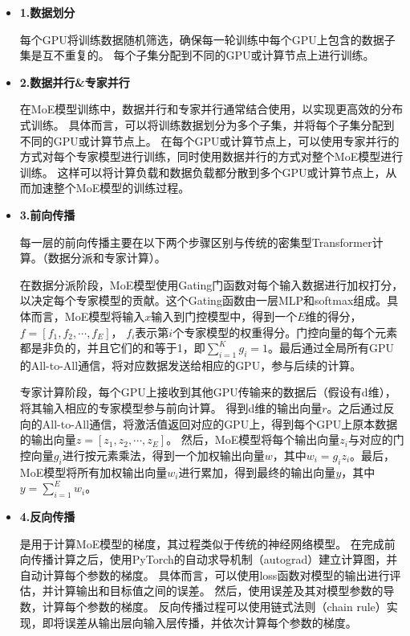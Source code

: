 \begin{itemize}

    \item \textbf{1.数据划分}
    
每个GPU将训练数据随机筛选，确保每一轮训练中每个GPU上包含的数据子集是互不重复的。
% 
每个子集分配到不同的GPU或计算节点上进行训练。
    
    \item \textbf{2.数据并行\&专家并行}
    
在MoE模型训练中，数据并行和专家并行通常结合使用，以实现更高效的分布式训练。
% 
具体而言，可以将训练数据划分为多个子集，并将每个子集分配到不同的GPU或计算节点上。
% 
在每个GPU或计算节点上，可以使用专家并行的方式对每个专家模型进行训练，同时使用数据并行的方式对整个MoE模型进行训练。
% 
这样可以将计算负载和数据负载都分散到多个GPU或计算节点上，从而加速整个MoE模型的训练过程。

    \item \textbf{3.前向传播}
    
    每一层的前向传播主要在以下两个步骤区别与传统的密集型Transformer计算。（数据分派和专家计算）。

在数据分派阶段，MoE模型使用Gating门函数对每个输入数据进行加权打分，以决定每个专家模型的贡献。这个Gating函数由一层MLP和softmax组成。具体而言，MoE模型将输入$x$输入到门控模型中，得到一个$E$维的得分，$f=[f_1,f_2,\cdots,f_E]$， $f_i$表示第$i$个专家模型的权重得分。门控向量的每个元素都是非负的，并且它们的和等于1，即$\sum_{i=1}^K g_i = 1$。最后通过全局所有GPU的All-to-All通信，将对应数据发送给相应的GPU，参与后续的计算。

专家计算阶段，每个GPU上接收到其他GPU传输来的数据后（假设有d维），将其输入相应的专家模型参与前向计算。
% 
得到d维的输出向量$r$。之后通过反向的All-to-All通信，将激活值返回对应的GPU上，得到每个GPU上原本数据的输出向量$z=[z_1,z_2,\cdots,z_E]$。
% 
然后，MoE模型将每个输出向量$z_i$与对应的门控向量$g_i$进行按元素乘法，得到一个加权输出向量$w$，其中$w_{i}=g_{i}z_{i}$。最后，MoE模型将所有加权输出向量$w_i$进行累加，得到最终的输出向量$y$，其中$y=\sum_{i=1}^E w_{i}$。

    \item \textbf{4.反向传播}
    
    是用于计算MoE模型的梯度，其过程类似于传统的神经网络模型。
    在完成前向传播计算之后，使用PyTorch的自动求导机制（autograd）建立计算图，并自动计算每个参数的梯度。
    具体而言，可以使用loss函数对模型的输出进行评估，并计算输出和目标值之间的误差。
    然后，使用误差及其对模型参数的导数，计算每个参数的梯度。
    反向传播过程可以使用链式法则（chain rule）实现，即将误差从输出层向输入层传播，并依次计算每个参数的梯度。


\end{itemize}
